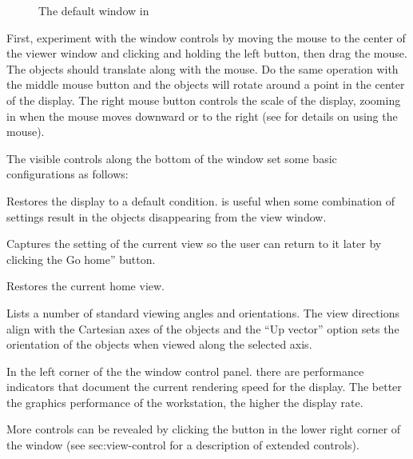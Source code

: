 \begin{figure}[htb]
  \begin{makeimage}
  \end{makeimage}
  \viewerwindow
  \caption{\label{fig:viewwindow} The default \viewer{} window in \SR{}}
\end{figure}


First, experiment with the \graphics{} window controls by moving the mouse
to the center of the viewer window and clicking and holding the left button,
then drag the mouse.  The objects should translate along with the
mouse.  Do the same operation with the middle mouse button and the objects
will rotate around a point in the center of the display.  The right mouse
button controls the scale of the display, zooming in when the mouse moves
downward or to the right (see  for details on using the mouse).

The visible controls along the bottom of the \viewer{} window set some basic
configurations as follows:
%
\begin{description}
   Restores the display to a default
  condition.  is useful when some combination of settings result in
  the objects disappearing from the view window.
  
   Captures the setting of the
  current view so the user can return to it later by clicking the Go home''
  button.

   Restores the current home view.
  
   Lists a number of standard viewing angles
  and orientations.  The view directions align with the Cartesian axes
  of the objects and the ``Up vector'' option sets the orientation of
  the objects when viewed along the selected axis.
\end{description}

In the left corner of the the \viewer{} window control panel. there are
performance indicators that document the current rendering speed for the
display.  The better the graphics performance of the workstation, the higher the display rate.

More controls can be revealed by clicking the
\latexhtml{\fbox{+}}{\button{[+]}} button in the lower right corner of
the \viewer{} window (see  {sec:view-control} for a description of extended controls).



